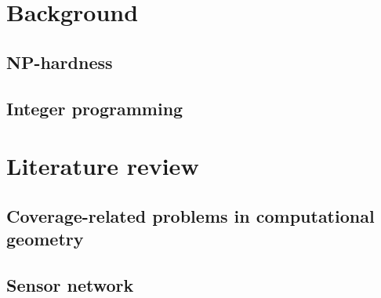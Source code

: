 \section{Background}
\subsection{NP-hardness}
\subsection{Integer programming}
\section{Literature review} 
\subsection{Coverage-related problems in computational geometry} 

\subsection{Sensor network} 

\subsection{}
